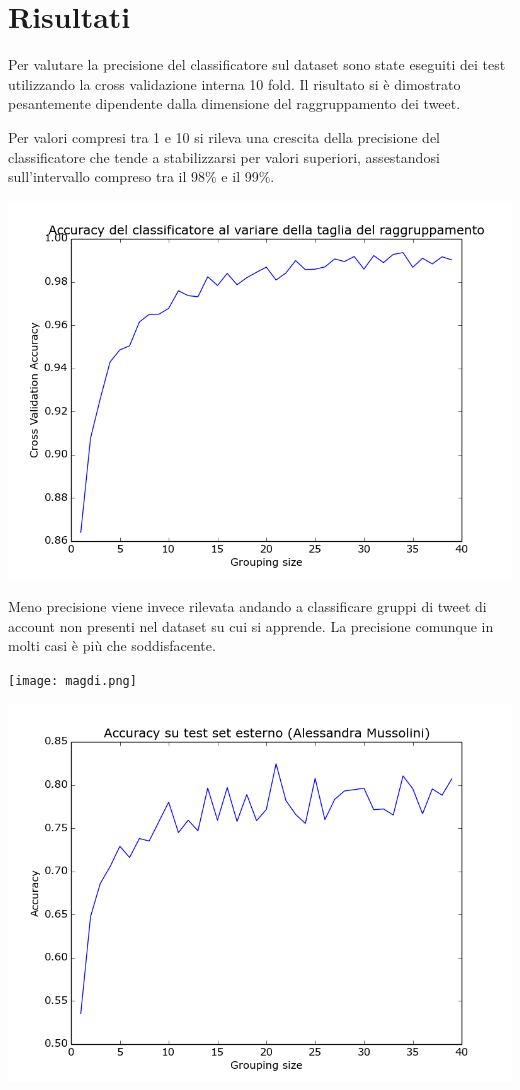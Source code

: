 \documentclass{article}
\begin{document}
\section{Risultati} 

Per valutare la precisione del classificatore sul dataset sono state eseguiti dei test utilizzando la cross validazione interna 10 fold. Il risultato si è dimostrato pesantemente dipendente dalla dimensione del raggruppamento dei tweet. 

Per valori compresi tra 1 e 10 si rileva una crescita della precisione del classificatore che tende a stabilizzarsi per valori superiori, assestandosi sull'intervallo compreso tra il 98\% e il 99\%.

\includegraphics[width=\linewidth]{grouping.png}

Meno precisione viene invece rilevata andando a classificare gruppi di tweet di account non presenti nel dataset su cui si apprende. La precisione comunque in molti casi è più che soddisfacente. 

\texttt{[image: magdi.png]}

\includegraphics[width=\linewidth]{musso.png}
\end{document}
